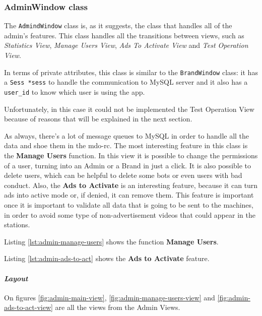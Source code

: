 \subsubsection{AdminWindow class}
%
The \texttt{AdmindWindow} class is, as it suggests, the class that handles all of the admin's features.
This class handles all the transitions between views, such as \emph{Statistics View}, \emph{Manage Users View}, \emph{Ads To Activate View} and \emph{Test Operation View}.
%
%

In terms of private attributes, this class is similar to the \texttt{BrandWindow} class: it has a \texttt{Sess *sess} to handle the communication to MySQL server and it also has a \texttt{user\_id} to know which user is using the app.

Unfortunately, in this case it could not be implemented the Test Operation View because of reasons that will be explained in the next section.

As always, there's a lot of message queues to MySQL in order to handle all the data and shoe them in the \gls{mdo-rc}.
The most interesting feature in this class is the \textbf{Manage Users} function. In this view it is possible to change the permissions of a user, turning into an Admin or a Brand in just a click. It is also possible to delete users, which can be helpful to delete some bots or even users with bad conduct.
Also, the \textbf{Ads to Activate} is an interesting feature, because it can turn ads into active mode or, if denied, it can remove them. This feature is important once it is important to validate all data that is going to be sent to the machines, in order to avoid some type of non-advertisement videos that could appear in the stations.

Listing \ref{lst:admin-manage-users} shows the function \textbf{Manage Users}.
%
%

Listing \ref{lst:admin-ads-to-act} shows the \textbf{Ads to Activate} feature.
%
%

\paragraph{\emph{Layout}}
%
On figures \ref{fig:admin-main-view}, \ref{fig:admin-manage-users-view} and \ref{fig:admin-ads-to-act-view} are all the views from the Admin Views.

